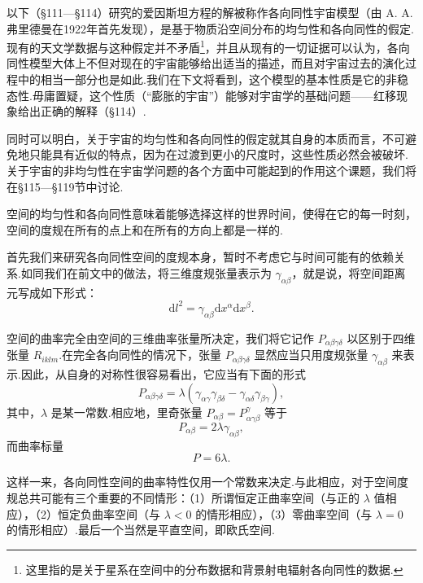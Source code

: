 以下（§111—§114）研究的爱因斯坦方程的解被称作各向同性宇宙模型（由 A. A. 弗里德曼在1922年首先发现），是基于物质沿空间分布的均匀性和各向同性的假定.现有的天文学数据与这种假定并不矛盾\footnote{这里指的是关于星系在空间中的分布数据和背景射电辐射各向同性的数据.}，并且从现有的一切证据可以认为，各向同性模型大体上不但对现在的宇宙能够给出适当的描述，而且对宇宙过去的演化过程中的相当一部分也是如此.我们在下文将看到，这个模型的基本性质是它的非稳态性.毋庸置疑，这个性质（“膨胀的宇宙”）能够对宇宙学的基础问题——红移现象给出正确的解释（§114）.

同时可以明白，关于宇宙的均匀性和各向同性的假定就其自身的本质而言，不可避免地只能具有近似的特点，因为在过渡到更小的尺度时，这些性质必然会被破坏.关于宇宙的非均匀性在宇宙学问题的各个方面中可能起到的作用这个课题，我们将在§115—§119节中讨论.

空间的均匀性和各向同性意味着能够选择这样的世界时间，使得在它的每一时刻，空间的度规在所有的点上和在所有的方向上都是一样的.

首先我们来研究各向同性空间的度规本身，暂时不考虑它与时间可能有的依赖关系.如同我们在前文中的做法，将三维度规张量表示为 $\gamma_{\alpha\beta}$，就是说，将空间距离元写成如下形式：
\begin{equation}
  \mathrm{d}l^{2}=\gamma_{\alpha\beta}\mathrm{d}x^{\alpha}\mathrm{d}x^{\beta}.
\end{equation}

空间的曲率完全由空间的三维曲率张量所决定，我们将它记作 $P_{\alpha\beta\gamma\delta}$ 以区别于四维张量 $R_{iklm}$.在完全各向同性的情况下，张量 $P_{\alpha\beta\gamma\delta}$ 显然应当只用度规张量 $\gamma_{\alpha\beta}$ 来表示.因此，从自身的对称性很容易看出，它应当有下面的形式
\begin{equation}
  P_{\alpha\beta\gamma\delta}
  =\lambda(\gamma_{\alpha\gamma}\gamma_{\beta\delta}
  -\gamma_{\alpha\delta}\gamma_{\beta\gamma}),
\end{equation}
其中，$\lambda$ 是某一常数.相应地，里奇张量 $P_{\alpha\beta}=P_{\alpha\gamma\beta}^{\gamma}$ 等于
\begin{equation}
  P_{\alpha\beta}=2\lambda\gamma_{\alpha\beta},
\end{equation}
而曲率标量
\begin{equation}
  P=6\lambda.
\end{equation}

这样一来，各向同性空间的曲率特性仅用一个常数来决定.与此相应，对于空间度规总共可能有三个重要的不同情形：（1）所谓恒定正曲率空间（与正的 $\lambda$ 值相应），（2）恒定负曲率空间（与 $\lambda<0$ 的情形相应），（3）零曲率空间（与 $\lambda=0$ 的情形相应）.最后一个当然是平直空间，即欧氏空间.

